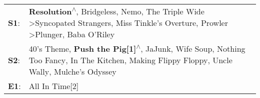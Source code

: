 \begin{supertabular}{p{0.03\textwidth}p{0.92\textwidth}}
 \textbf{S1}:  &  \textbf{Resolution\textsuperscript{$\wedge$}}, \enspace Bridgeless\textsuperscript{}, \enspace Nemo\textsuperscript{}, \enspace The Triple Wide\textsuperscript{} \textgreater \enspace Syncopated Strangers\textsuperscript{}, \enspace Miss Tinkle's Overture\textsuperscript{}, \enspace Prowler\textsuperscript{} \textgreater \enspace Plunger\textsuperscript{}, \enspace Baba O'Riley\textsuperscript{}  \enspace  \\
 \textbf{S2}:  &               40's Theme\textsuperscript{}, \enspace \textbf{Push the Pig[1]\textsuperscript{$\wedge$}}, \enspace JaJunk\textsuperscript{}, \enspace Wife Soup\textsuperscript{}, \enspace Nothing Too Fancy\textsuperscript{}, \enspace In The Kitchen\textsuperscript{}, \enspace Making Flippy Floppy\textsuperscript{}, \enspace Uncle Wally\textsuperscript{}, \enspace Mulche's Odyssey\textsuperscript{}  \enspace  \\
 \textbf{E1}:  &                                                                                                                                                                                                                                                                                                                                                                                All In Time[2]\textsuperscript{}  \enspace  \\
\end{supertabular}
